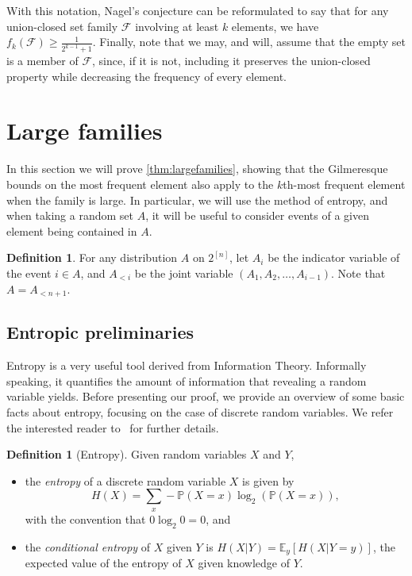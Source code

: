 \documentclass[a4paper,12pt]{article}
\theoremstyle{mystyle}	%
\theoremstyle{definition}
\newtheorem{definition}[theorem]{Definition}
\newcommand{\E}{\mathbb{E}}
\renewcommand{\Pr}{\mathbb{P}}
\newcommand{\6}{\partial}
\begin{document}
With this notation, Nagel's conjecture can be reformulated to say that for any union-closed set family $\mathcal{F}$ involving at least $k$ elements, we have $f_k(\mathcal{F}) \ge \frac{1}{2^{k-1} + 1}$. Finally, note that we may, and will, assume that the empty set is a member of $\mathcal{F}$, since, if it is not, including it preserves the union-closed property while decreasing the frequency of every element.

\section{Large families} \label{sec:large}

In this section we will prove \cref{thm:largefamilies}, showing that the Gilmeresque bounds on the most frequent element also apply to the $k$th-most frequent element when the family is large. In particular, we will use the method of entropy, and when taking a random set $A$, it will be useful to consider events of a given element being contained in $A$.

\begin{definition}
    For any distribution $A$ on $2^{[n]}$, let $A_i$ be the indicator variable of the event $i\in A$, and $A_{< i}$ be the joint variable $(A_1,A_2,\dotsc,A_{i-1})$. Note that $A = A_{< n+1}$.
\end{definition}

\subsection{Entropic preliminaries}

Entropy is a very useful tool derived from Information Theory.  Informally speaking, it quantifies the amount of information that revealing a random variable yields. Before presenting our proof, we provide an overview of some basic facts about entropy, focusing on the case of discrete random variables. We refer the interested reader to~\cite{cover1999elements} for further details.

\begin{definition}[Entropy]
    Given random variables $X$ and $Y$,
    \begin{itemize}
        \item[(i)] the \emph{entropy} of a discrete random variable $X$ is given by 
        \[H(X) = \sum_{x} -\Pr(X=x) \log_2(\Pr(X=x)),\]
        with the convention that $0 \log_2 0 = 0$, and
        
        \item[(ii)] the \emph{conditional entropy} of $X$ given $Y$ is
        $H(X|Y) = \E_y[H(X|Y=y)]$, the expected value of the entropy of $X$ given knowledge of $Y$. 
    \end{itemize}
\end{definition}
\end{document}

